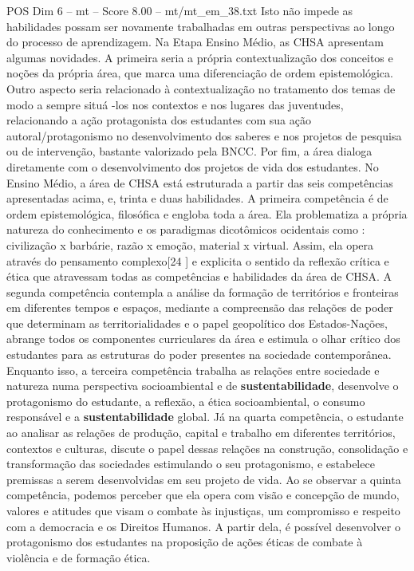 \begin{textsample}{POS Dim 6 – mt – Score 8.00 – mt/mt\_em\_38.txt}
Isto não impede as habilidades possam ser novamente trabalhadas em outras perspectivas ao longo do processo de aprendizagem.
Na Etapa Ensino Médio, as CHSA apresentam algumas novidades.
A primeira seria a própria contextualização dos conceitos e noções da própria área, que marca uma diferenciação de ordem epistemológica.
Outro aspecto seria relacionado à contextualização no tratamento dos temas de modo a sempre situá -los nos contextos e nos lugares das juventudes, relacionando a ação protagonista dos estudantes com sua ação autoral/protagonismo no desenvolvimento dos saberes e nos projetos de pesquisa ou de intervenção, bastante valorizado pela BNCC.
Por fim, a área dialoga diretamente com o desenvolvimento dos projetos de vida dos estudantes.
No Ensino Médio, a área de CHSA está estruturada a partir das seis competências apresentadas acima, e, trinta e duas habilidades.
A primeira competência é de ordem epistemológica, filosófica e engloba toda a área.
Ela problematiza a própria natureza do conhecimento e os paradigmas dicotômicos ocidentais como : civilização x barbárie, razão x emoção, material x virtual.
Assim, ela opera através do pensamento complexo[24 ] e explicita o sentido da reflexão crítica e ética que atravessam todas as competências e habilidades da área de CHSA.
A segunda competência contempla a análise da formação de territórios e fronteiras em diferentes tempos e espaços, mediante a compreensão das relações de poder que determinam as territorialidades e o papel geopolítico dos Estados-Nações, abrange todos os componentes curriculares da área e estimula o olhar crítico dos estudantes para as estruturas do poder presentes na sociedade contemporânea.
Enquanto isso, a terceira competência trabalha as relações entre sociedade e natureza numa perspectiva socioambiental e de \textbf{sustentabilidade}, desenvolve o protagonismo do estudante, a reflexão, a ética socioambiental, o consumo responsável e a \textbf{sustentabilidade} global.
Já na quarta competência, o estudante ao analisar as relações de produção, capital e trabalho em diferentes territórios, contextos e culturas, discute o papel dessas relações na construção, consolidação e transformação das sociedades estimulando o seu protagonismo, e estabelece premissas a serem desenvolvidas em seu projeto de vida.
Ao se observar a quinta competência, podemos perceber que ela opera com visão e concepção de mundo, valores e atitudes que visam o combate às injustiças, um compromisso e respeito com a democracia e os Direitos Humanos.
A partir dela, é possível desenvolver o protagonismo dos estudantes na proposição de ações éticas de combate à violência e de formação ética.

\end{textsample}
